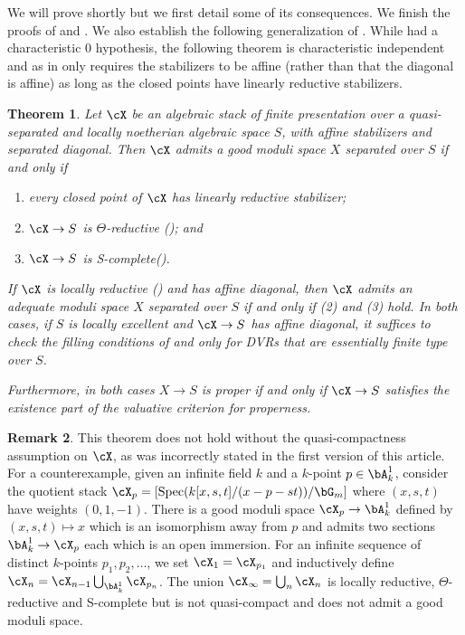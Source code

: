 \documentclass[a4paper]{amsart}
\numberwithin{equation}{section}
\theoremstyle{plain}
\newtheorem{thm}{Theorem}[section]
\theoremstyle{definition}
\newtheorem{remark}[thm]{Remark}
\DeclareMathOperator{\Spec}{Spec}
\def\Scomplete{\textsf{S}-complete}
\begin{document}
{We will prove  shortly but we first  detail some of its consequences.  We finish the proofs of  and .  We also establish the following generalization of .  While  had a characteristic 0 hypothesis, the following theorem is characteristic independent and as in  only requires the stabilizers to be affine (rather than that the diagonal is affine) as long as the closed points have linearly reductive stabilizers.
}

\begin{thm}\label{T:existence-separated}
	Let $\cX$ be an algebraic stack of finite presentation over a quasi-separated and locally noetherian algebraic space $S$, with affine stabilizers and separated diagonal. Then $\cX$ admits a good moduli space $X$ separated over $S$ if and only if
		\begin{enumerate}
		\item  every closed point of $\cX$ has linearly reductive stabilizer;
		\item $\cX  \to S$ is $\Theta$-reductive  (); and
		\item $\cX \to S$ is \Scomplete ().
	\end{enumerate} 
		If $\cX$ is locally reductive () and has affine diagonal, then $\cX$ admits an adequate moduli space $X$ separated over $S$ if and only if (2) and (3) hold. In both cases, if $S$ is locally excellent and $\cX \to S$ has affine diagonal, it suffices to check the filling conditions of  and  only for DVRs that are essentially finite type over $S$.

Furthermore, in both cases $X \to S$ is proper if and only if $\cX \to S$ satisfies the existence part of the valuative criterion for properness.
\end{thm}

\begin{remark}
This theorem does not hold without the quasi-compactness assumption on $\cX$, as was incorrectly stated in the first version of this article.  For a counterexample, given an infinite field $k$ and a $k$-point $p \in \bA^1_{k}$, consider the quotient stack $\cX_p = [\Spec(k[x,s,t]/(x-p-st))/\bG_m]$ where $(x,s,t)$ have weights $(0,1,-1)$.  There is a good moduli space $\cX_p \to \bA^1_{k}$ defined by $(x,s,t) \mapsto x$ which is an isomorphism away from $p$ and admits two sections $\bA^1_k \to \cX_p$ each which is an open immersion. For an infinite sequence of distinct $k$-points $p_1, p_2, \ldots$, we set $\cX_1 = \cX_{p_1}$ and inductively define $\cX_n = \cX_{n-1} \bigcup_{\bA^1_k} \cX_{p_n}$.  The union $\cX_{\infty} = \bigcup_n \cX_n$  is locally reductive, $\Theta$-reductive and \textsf{S}-complete but is not quasi-compact and does not admit a good moduli space.
\end{remark}
\end{document}

